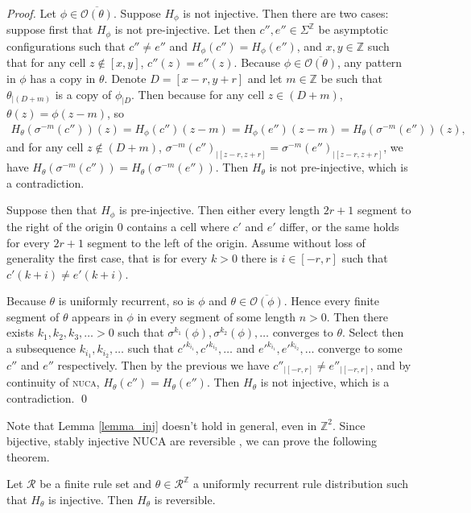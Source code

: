 \documentclass[runningheads]{llncs}
\newcommand{\Z}{\mathbb{Z}}
\newcommand{\R}{\mathcal{R}}
\begin{document}
\begin{proof}
Let $\phi \in \overline{\mathcal{O}(\theta)}$. Suppose $H_\phi$ is not injective. Then there are two cases: suppose first that $H_{\phi}$ is not pre-injective. Let then $c'',e'' \in \Sigma^\Z$ be asymptotic configurations such that $c''\neq e''$ and $H_{\phi} (c'') = H_{\phi} (e'')$, and $x,y\in \Z$ such that for any cell $z \notin [x,y]$, $c''(z) = e''(z)$. Because $\phi \in \overline{\mathcal{O}(\theta)}$, any pattern in $\phi$ has a copy in $\theta$. Denote $D=[x-r,y+r]$ and let $m \in \Z$ be such that $\theta_{|(D+m)}$ is a copy of $\phi_{|D}$. Then because for any cell $z \in (D+m)$, $\theta(z)=\phi(z-m)$, so 
\begin{align*}
H_\theta (\sigma^{-m} (c''))(z) = H_{\phi} (c'')(z-m) = H_{\phi} (e'')(z-m) =H_\theta (\sigma^{-m} (e''))(z),
\end{align*}
and for any cell $z \notin (D+m)$, $\sigma^{-m} (c'')_{|[z-r,z+r]}=\sigma^{-m} (e'')_{|[z-r,z+r]}$, we have $H_\theta (\sigma^{-m} (c'')) = H_\theta (\sigma^{-m} (e''))$. Then $H_\theta$ is not pre-injective, which is a contradiction.

Suppose then that $H_{\phi}$ is pre-injective. Then either every length $2r+1$ segment to the right of the origin 0 contains a cell where $c'$ and $e'$ differ, or the same holds for every $2r+1$ segment to the left of the origin. Assume without loss of generality the first case, that is for every $k>0$ there is $i \in [-r,r]$ such that $c'(k+i) \neq e'(k+i)$.

Because $\theta$ is uniformly recurrent, so is $\phi$ and $\theta \in \overline{\mathcal{O} (\phi)}$. Hence every finite segment of $\theta$ appears in $\phi$ in every segment of some length $n>0$. Then there exists $k_1, k_2, k_3, \ldots > 0$ such that $\sigma^{k_1} (\phi),\sigma^{k_2} (\phi),\ldots $ converges to $\theta$. Select then a subsequence  $k_{i_1},k_{i_2},\ldots$ such that $c'^{k_{i_1}},c'^{k_{i_2}},\ldots$ and $e'^{k_{i_1}},e'^{k_{i_2}},\ldots$ converge to some $c''$ and $e''$ respectively. Then by the previous we have $c''_{|[-r,r]}\neq e''_{|[-r,r]}$, and by continuity of \textsc{nuca}, $H_\theta (c'') = H_\theta (e'')$. Then $H_\theta$ is not injective, which is a contradiction. 
\qed
\end{proof}

Note that Lemma \ref{lemma_inj} doesn't hold in general, even in $\Z^2$. Since bijective, stably injective NUCA are reversible \cite{phung}, we can prove the following theorem.

\begin{theorem} \label{unif_revers_fin}
Let $\R$ be a finite rule set and $\theta\in \R^\Z$ a uniformly recurrent rule distribution such that $H_\theta$ is injective. Then $H_\theta$ is reversible.
\end{theorem}
\end{document}
